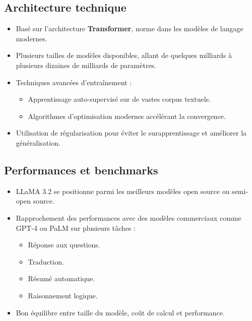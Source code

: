 \subsection{Architecture technique}
\begin{itemize}
    \item Basé sur l’architecture \textbf{Transformer}, norme dans les modèles de langage modernes.
    \item Plusieurs tailles de modèles disponibles, allant de quelques milliards à plusieurs dizaines de milliards de paramètres.
    \item Techniques avancées d’entraînement :
    \begin{itemize}
        \item Apprentissage auto-supervisé sur de vastes corpus textuels.
        \item Algorithmes d’optimisation modernes accélérant la convergence.
    \end{itemize}
    \item Utilisation de régularisation pour éviter le surapprentissage et améliorer la généralisation.
\end{itemize}

\subsection{Performances et benchmarks}
\begin{itemize}
    \item LLaMA 3.2 se positionne parmi les meilleurs modèles open source ou semi-open source.
    \item Rapprochement des performances avec des modèles commerciaux comme GPT-4 ou PaLM sur plusieurs tâches :
    \begin{itemize}
        \item Réponse aux questions.
        \item Traduction.
        \item Résumé automatique.
        \item Raisonnement logique.
    \end{itemize}
    \item Bon équilibre entre taille du modèle, coût de calcul et performance.
\end{itemize}

